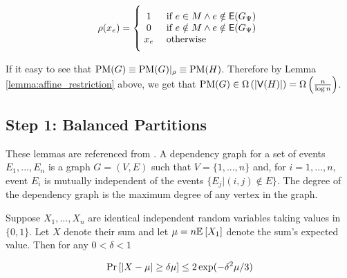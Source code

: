 \documentclass[11pt]{article}
\begin{document}
\begin{enumerate}
	\[
        \rho(x_e)=
        \Bigger[10]\{\begin{array}{@{}cl}
                1 & \text{ if $e \in M \land e \notin \Edges{G_{\EmbeddingFunc}}$} \\
          0 & \text{ if $e \notin M \land e \notin \Edges{G_{\EmbeddingFunc}}$}\\
                x_e & \text{ otherwise} 
        \end{array}
\]

	If it easy to see that $\text{PM}(G) \equiv \text{PM}(G)|_\rho \equiv \text{PM}(H)$. Therefore by Lemma \ref{lemma:affine_restriction} above, we get that $\text{PM}(G) \in \Omega\left(|\mathsf{V}(H)|\right) = \Omega\left(\frac{n}{\log n}\right)$. 

  \end{enumerate}

\subsection{Step 1: Balanced Partitions}
\label{sec:partition-lemma}


These lemmas are referenced from \citet[Chapter 1, Chapter 7]{mitzenmacher2017probability}.
A dependency graph for a set of events $E_1, . . . , E_n$ is a graph $G=(V, E)$ such that $V = \{1,.. . , n\}$ and,  for $i= 1,\dots, n$, event $E_i$ is mutually independent
of the events $\{E_j | (i, j) \notin E\}$. The degree of the dependency graph is the maximum degree of any vertex in the graph.


\begin{lemma}\label{lemma:mult-chernoff}
Suppose $X_1, ..., X_n$ are identical independent random variables taking values in $\{0, 1\}$. Let $X$ denote their sum and let $\mu = n\mathbb{E}_{}\left[X_1\right]$ denote the sum's expected value. Then for any $0 < \delta < 1$

\[ \Pr\left[|X - \mu| \geq \delta \mu \right] \leq 2\exp(-\delta^2\mu/3)\]
	
\end{lemma}
\end{document}
